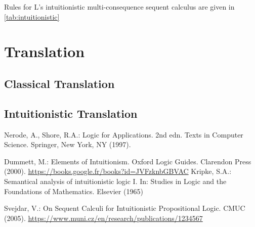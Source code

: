 \documentclass[runningheads]{llncs}
\begin{document}
\developmentSequentIntuitionisticDefinition

Rules for L's intuitionistic multi-consequence sequent calculus are given in \ref{tab:intuitionistic}


\RulesIntuitionisticSequentCalculus


\section{Translation}

\nodeTranslationFunction

\uselessTheorem

\subsection{Classical Translation}



\localTranslationValidityTheorem
    


\TranslationClassical





\subsection{Intuitionistic Translation}




%
%
%
% 
% 
%
\begin{thebibliography}{8}

    Nerode, A., Shore, R.A.: Logic for Applications. 2nd edn. Texts in Computer Science. Springer, New York, NY (1997). 
    
    Dummett, M.: Elements of Intuitionism. Oxford Logic Guides. Clarendon Press (2000). \url{https://books.google.fr/books?id=JVFzknbGBVAC}
    Kripke, S.A.: Semantical analysis of intuitionistic logic I. In: Studies in Logic and the Foundations of Mathematics. Elsevier (1965)


    Svejdar, V.: On Sequent Calculi for Intuitionistic Propositional Logic. CMUC (2005). \url{https://www.muni.cz/en/research/publications/1234567}


\end{thebibliography}
\end{document}
